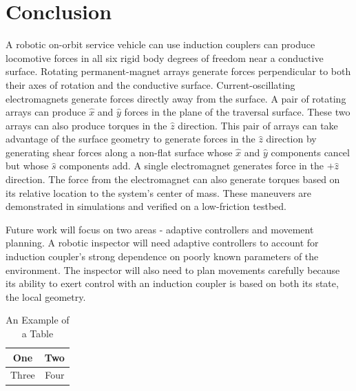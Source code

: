 \documentclass[letterpaper, 10 pt, conference]{ieeeconf}  %
\begin{document}
\section{Conclusion}
A robotic on-orbit service vehicle can use induction couplers can produce locomotive forces in all six rigid body degrees of freedom near a conductive surface. Rotating permanent-magnet arrays generate forces perpendicular to both their axes of rotation and the conductive surface. Current-oscillating electromagnets generate forces directly away from the surface. A pair of rotating arrays can produce $\hat{x}$ and $\hat{y}$ forces in the plane of the traversal surface. These two arrays can also produce torques in the $\hat{z}$ direction. This pair of arrays can take advantage of the surface geometry to generate forces in the $\hat{z}$ direction by generating shear forces along a non-flat surface whose $\hat{x}$ and $\hat{y}$ components cancel but whose $\hat{s}$ components add. A single electromagnet generates force in the $+\hat{z}$ direction. The force from the electromagnet can also generate torques based on its relative location to the system's center of mass. These maneuvers are demonstrated in simulations and verified on a low-friction testbed.  

Future work will focus on two areas - adaptive controllers and movement planning. A robotic inspector will need adaptive controllers to account for induction coupler's strong dependence on poorly known parameters of the environment.  The inspector will also need to plan movements carefully because its ability to exert control with an induction coupler is based on both its state, the local geometry.      

\begin{table}[h]
\caption{An Example of a Table}
\label{table_example}
\begin{center}
\begin{tabular}{|c||c|}
\hline
One & Two\\
\hline
Three & Four\\
\hline
\end{tabular}
\end{center}
\end{table}
\end{document}
